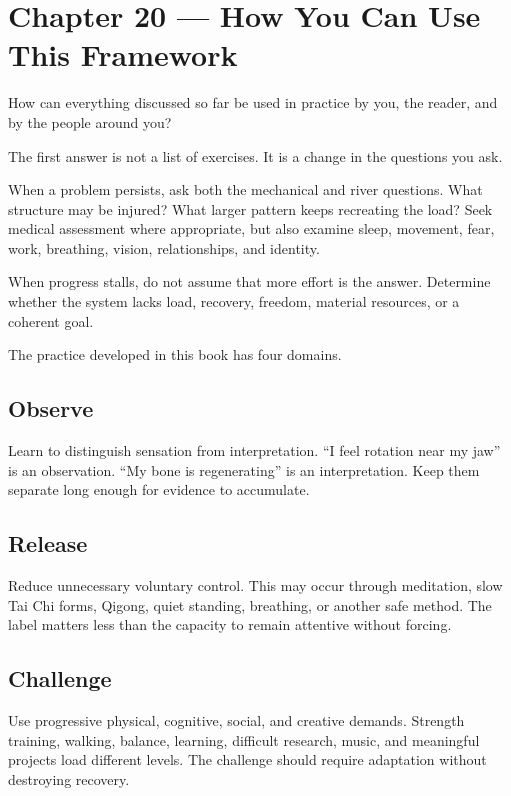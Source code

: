 \chapter{Chapter 20 --- How You Can Use This Framework}\label{chapter-20-how-you-can-use-this-framework}

How can everything discussed so far be used in practice by you, the reader, and by the people around you?

The first answer is not a list of exercises. It is a change in the questions you ask.

When a problem persists, ask both the mechanical and river questions. What structure may be injured? What larger pattern keeps recreating the load? Seek medical assessment where appropriate, but also examine sleep, movement, fear, work, breathing, vision, relationships, and identity.

When progress stalls, do not assume that more effort is the answer. Determine whether the system lacks load, recovery, freedom, material resources, or a coherent goal.

The practice developed in this book has four domains.

\section{Observe}\label{observe}

Learn to distinguish sensation from interpretation. ``I feel rotation near my jaw'' is an observation. ``My bone is regenerating'' is an interpretation. Keep them separate long enough for evidence to accumulate.

\section{Release}\label{release}

Reduce unnecessary voluntary control. This may occur through meditation, slow Tai Chi forms, Qigong, quiet standing, breathing, or another safe method. The label matters less than the capacity to remain attentive without forcing.

\section{Challenge}\label{challenge}

Use progressive physical, cognitive, social, and creative demands. Strength training, walking, balance, learning, difficult research, music, and meaningful projects load different levels. The challenge should require adaptation without destroying recovery.

